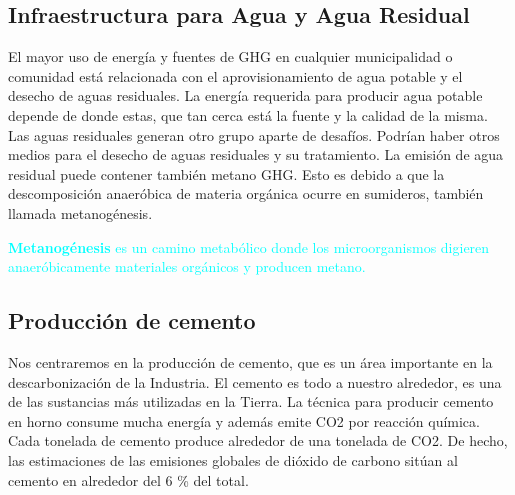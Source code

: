 \documentclass[runningheads]{llncs}
\begin{document}
\subsection{Infraestructura para Agua y Agua Residual}
El mayor uso de energía y fuentes de GHG en cualquier municipalidad o comunidad está relacionada con el aprovisionamiento de agua potable y el desecho de aguas residuales. La energía requerida para producir agua potable depende de donde estas, que tan cerca está la fuente y la calidad de la misma. 
Las aguas residuales generan otro grupo aparte de desafíos. Podrían haber otros medios para el desecho de aguas residuales y su tratamiento. La emisión de agua residual puede contener también metano GHG. Esto es debido a que la descomposición anaeróbica de materia orgánica ocurre en sumideros, también llamada metanogénesis.
\begin{center}
\textcolor{cyan}{\textbf{Metanogénesis} es un camino metabólico donde los microorganismos digieren anaeróbicamente materiales orgánicos y producen metano.}\end{center}

\subsection{Producción de cemento}
Nos centraremos en la producción de cemento,  que es un área importante en la descarbonización de la Industria. El cemento es todo a nuestro alrededor,  es una de las sustancias más utilizadas en la Tierra. La técnica para producir cemento en horno consume mucha energía y además emite CO2  por reacción química. Cada tonelada de cemento produce alrededor de una tonelada de CO2. De hecho, las estimaciones de las emisiones globales de dióxido de carbono sitúan al cemento en alrededor del 6 \% del total. 
\end{document}
